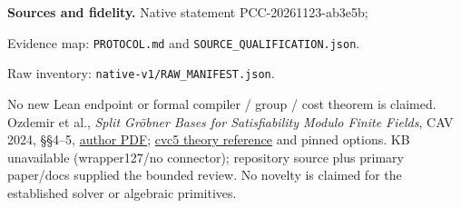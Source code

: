 \documentclass[10pt]{article}
\begin{document}
\textbf{Sources and fidelity.} Native statement PCC-20261123-ab3e5b;
\par Evidence map: \texttt{PROTOCOL.md} and \texttt{SOURCE\_QUALIFICATION.json}.\par
Raw inventory: \texttt{native-v1/RAW\_MANIFEST.json}.\par
No new Lean endpoint or formal compiler /
group / cost theorem is claimed. Ozdemir et al., \emph{Split Gr\"obner Bases for
Satisfiability Modulo Finite Fields}, CAV 2024, \S\S4--5,
\href{https://theory.stanford.edu/~barrett/pubs/OPB+24.pdf}{author PDF};
\href{https://cvc5.github.io/docs/cvc5-1.4.2/theories/finite_field.html}{cvc5 theory reference}
and pinned options. KB unavailable (wrapper127/no connector); repository
source plus primary paper/docs supplied the bounded review. No novelty is
claimed for the established solver or algebraic primitives.
\end{document}
